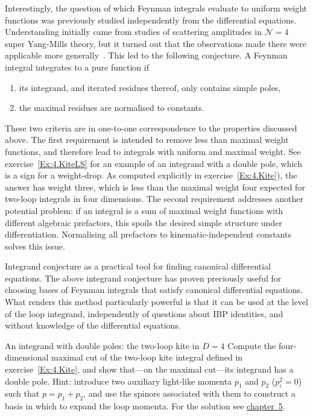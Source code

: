 Interestingly, the question of which Feynman integrals evaluate to uniform weight functions was previously studied 
independently from the differential equations.
Understanding initially came from studies of scattering amplitudes in ${\mathcal N} =4$ super Yang-Mills theory, 
but it turned out that the observations made there were applicable more generally~\cite{ch4Arkani-Hamed:2010pyv,ch4Henn:2013pwa}. 
This led to the following conjecture. A Feynman integral integrates to a pure function if 
\begin{enumerate}
\item its integrand, and iterated residues thereof, only contains simple poles,
\item the maximal residues are normalised to constants.
\end{enumerate}
These two criteria are in one-to-one correspondence to the properties discussed above. 
The first requirement is intended to remove less than maximal weight functions, and therefore lead to integrals with uniform and maximal weight. 
See exercise~\ref{Ex:4.KiteLS} for an example of an integrand with a double pole, which is a sign for a weight-drop. 
As computed explicitly in exercise~\ref{Ex:4.Kite}), the answer has weight three, which is less than the maximal weight four expected for two-loop integrals in four dimensions.
The second requirement addresses another potential problem: if an integral is a sum of maximal weight functions with different algebraic prefactors, 
this spoils the desired simple structure under differentiation. Normalising all prefactors to kinematic-independent constants solves this issue.


\begin{important}{Integrand conjecture as a practical tool for finding canonical differential equations.}
The above integrand conjecture has proven preciously useful for choosing bases of Feynman integrals that satisfy canonical differential equations. What renders this method particularly powerful is that it can be used at the level of the loop integrand, independently of questions about IBP identities, and without knowledge of the differential equations.
\end{important}


\vspace{-0.6cm}
\begin{exer}{An integrand with double poles: the two-loop kite in $D=4$}
\label{Ex:4.KiteLS}
Compute the four-dimensional maximal cut of the two-loop kite integral defined in exercise~\ref{Ex:4.Kite}, and show that---on the maximal cut---its integrand has a double pole. Hint: introduce two auxiliary light-like momenta $p_1$ and $p_2$ ($p_i^2=0$) such that $p=p_1+p_2$, and use the spinors associated with them to construct a basis in which to expand the loop momenta.
For the solution see \hyperref[Sol:4.KiteLS]{chapter~5}.
\end{exer}


